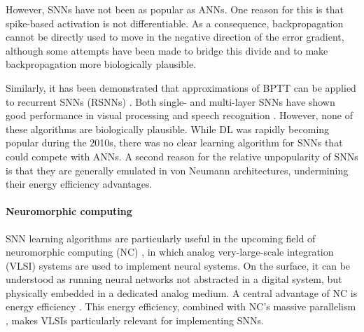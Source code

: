 	However, SNNs have not been as popular as ANNs.
	One reason for this is that spike-based activation is not differentiable.
	As a consequence, backpropagation cannot be directly used to move in the negative direction of the error gradient, although some attempts have been made to bridge this divide \citep{bohte2002error,hong2010cooperative,xu2013supervised,ourdighi2016efficient,lee2016training,sacramento2018dendritic,bellec2019biologically,whittington2019theories} and to make backpropagation more biologically plausible.

	Similarly, it has been demonstrated that approximations of BPTT can be applied to recurrent SNNs (RSNNs) \citep{huh2017gradient,bellec2018long}.
	Both single- and multi-layer SNNs have shown good performance in visual processing \citep{escobar2009action,kheradpisheh2018stdp,liu2017fast} and speech recognition \citep{tavanaei2017bio,dong2018unsupervised}.
	However, none of these algorithms are biologically plausible.
	While DL was rapidly becoming popular during the 2010s, there was no clear learning algorithm for SNNs that could compete with ANNs.
	A second reason for the relative unpopularity of SNNs is that they are generally emulated in von Neumann architectures, undermining their energy efficiency advantages.

\paragraph{Neuromorphic computing}  %
	SNN learning algorithms are particularly useful in the upcoming field of neuromorphic computing (NC) \citep{mitra2008real}, in which analog very-large-scale integration (VLSI) systems are used to implement neural systems.
	On the surface, it can be understood as running neural networks not abstracted in a digital system, but physically embedded in a dedicated analog medium.
	A central advantage of NC is energy efficiency \citep{hasler1990vlsi,lee1990parallel,tarassenko1990real}.
	This energy efficiency, combined with NC's massive parallelism \citep{monroe2014neuromorphic}, makes VLSIs particularly relevant for implementing SNNs.

